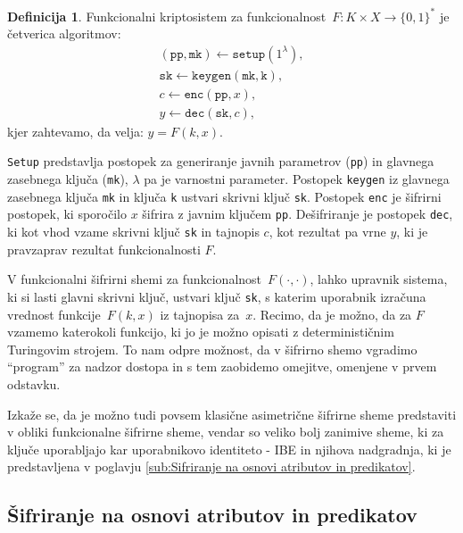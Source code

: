 \documentclass[12pt,a4paper,openany,tikz]{book}
\theoremstyle{plain}
\theoremstyle{definition}
\newtheorem{defn}[thm]{Definicija} %
\begin{document}
\begin{mdframed}[frametitle={Funkcionalni kriptosistem}]
\begin{defn}
Funkcionalni kriptosistem za funkcionalnost~$F: K \times X \rightarrow {\{}0,1{\}}^*$ je četverica algoritmov:
\begin{align*}
  (\texttt{pp}, \texttt{mk}) \leftarrow \texttt{setup}(1^\lambda), \\
  \texttt{sk} \leftarrow \texttt{keygen}(\texttt{mk}, \texttt{k}), \\
  c \leftarrow \texttt{enc}(\texttt{pp}, x), \\
  y \leftarrow \texttt{dec}(\texttt{sk}, c),
\end{align*}
kjer zahtevamo, da velja: $y=F(k, x)$.

\texttt{Setup} predstavlja postopek za generiranje javnih parametrov (\texttt{pp}) in glavnega zasebnega ključa (\texttt{mk}), $\lambda$ pa je varnostni parameter. Postopek \texttt{keygen} iz glavnega zasebnega ključa \texttt{mk} in ključa \texttt{k} ustvari skrivni ključ \texttt{sk}. Postopek \texttt{enc} je šifrirni postopek, ki sporočilo $x$ šifrira z javnim ključem \texttt{pp}. Dešifriranje je postopek \texttt{dec}, ki kot vhod vzame skrivni ključ \texttt{sk} in tajnopis $c$, kot rezultat pa vrne $y$, ki je pravzaprav rezultat funkcionalnosti $F$.
\label{def:fe}
\end{defn}
\end{mdframed}

V funkcionalni šifrirni shemi za funkcionalnost~$F(\cdot, \cdot)$, lahko upravnik sistema, ki si lasti glavni skrivni ključ, ustvari ključ \texttt{sk}, s katerim uporabnik izračuna vrednost funkcije~$F(k, x)$ iz tajnopisa za~$x$. Recimo, da je možno, da za $F$ vzamemo katerokoli funkcijo, ki jo je možno opisati z determinističnim Turingovim strojem. To nam odpre možnost, da v šifrirno shemo vgradimo ``program'' za nadzor dostopa in s tem zaobidemo omejitve, omenjene v prvem odstavku.

Izkaže se, da je možno tudi povsem klasične asimetrične šifrirne sheme predstaviti v obliki funkcionalne šifrirne sheme, vendar so veliko bolj zanimive sheme, ki za ključe uporabljajo kar uporabnikovo identiteto - \gls{IBE} in njihova nadgradnja, ki je predstavljena v poglavju \ref{sub:Sifriranje na osnovi atributov in predikatov}.

\subsection*{Šifriranje na osnovi atributov in predikatov}
\label{sub:Sifriranje na osnovi atributov in predikatov}
\end{document}
